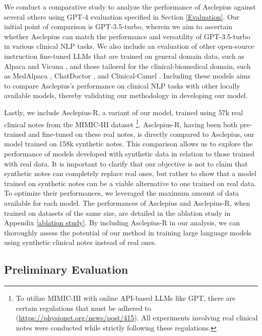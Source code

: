 \documentclass[11pt]{article}
\begin{document}
We conduct a comparative study to analyze the performance of Asclepius against several others using GPT-4 evaluation specified in Section \ref{Evaluation}. 
Our initial point of comparison is GPT-3.5-turbo, wherein we aim to ascertain whether Asclepius can match the performance and versatility of GPT-3.5-turbo in various clinical NLP tasks.
We also include an evaluation of other open-source instruction fine-tuned LLMs that are trained on general domain data, such as Alpaca \citep{alpaca} and Vicuna \citep{vicuna2023}, and those tailored for the clinical-biomedical domain, such as MedAlpaca \citep{han2023medalpaca}, ChatDoctor \citep{yunxiang2023chatdoctor}, and Clinical-Camel \citep{toma2023clinical}. 
Including these models aims to compare Asclepius's performance on clinical NLP tasks with other locally available models, thereby validating our methodology in developing our model.


Lastly, we include Asclepius-R, a variant of our model, trained using 57k real clinical notes from the MIMIC-III dataset \citep{johnson2016mimic}\footnote{To utilize MIMIC-III with online API-based LLMs like GPT, there are certain regulations that must be adhered to (\url{https://physionet.org/news/post/415}). All experiments involving real clinical notes were conducted while strictly following these regulations.}.
Asclepius-R, having been both pre-trained and fine-tuned on these real notes, is directly compared to Asclepius, our model trained on 158k synthetic notes.
This comparison allows us to explore the performance of models developed with synthetic data in relation to those trained with real data.
It is important to clarify that our objective is not to claim that synthetic notes can completely replace real ones, but rather to show that a model trained on synthetic notes can be a viable alternative to one trained on real data.
To optimize their performances, we leveraged the maximum amount of data available for each model.
The performances of Asclepius and Asclepius-R, when trained on datasets of the same size, are detailed in the ablation study in Appendix \ref{ablation study}.
By including Asclepius-R in our analysis, we can thoroughly assess the potential of our method in training large language models using synthetic clinical notes instead of real ones.




\subsection{Preliminary Evaluation}\label{Preliminary Assessment}
\end{document}
